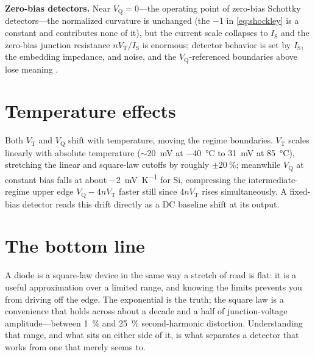 \documentclass[12pt]{article}
\newcommand{\IS}{I_{\mathrm{S}}}
\newcommand{\VT}{V_{\mathrm{T}}}
\newcommand{\VQ}{V_{\mathrm{Q}}}
\begin{document}
\textbf{Zero-bias detectors.}
Near $\VQ = 0$---the operating point of zero-bias Schottky detectors---the normalized curvature is unchanged (the $-1$ in \eqref{eq:shockley} is a constant and contributes none of it), but the current scale collapses to $\IS$ and the zero-bias junction resistance $n\VT/\IS$ is enormous; detector behavior is set by $\IS$, the embedding impedance, and noise, and the $\VQ$-referenced boundaries above lose meaning \cite{maas}.

\section*{Temperature effects}

Both $\VT$ and $\VQ$ shift with temperature, moving the regime boundaries.
$\VT$ scales linearly with absolute temperature ($\sim$\SI{20}{\milli\volt} at \SI{-40}{\degreeCelsius} to \SI{31}{\milli\volt} at \SI{85}{\degreeCelsius}), stretching the linear and square-law cutoffs by roughly $\pm\SI{20}{\percent}$; meanwhile $\VQ$ at constant bias falls at about \SI{-2}{\milli\volt\per\kelvin} for Si, compressing the intermediate-regime upper edge $\VQ - 4n\VT$ faster still since $4n\VT$ rises simultaneously.
A fixed-bias detector reads this drift directly as a DC baseline shift at its output.

\section*{The bottom line}

A diode is a square-law device in the same way a stretch of road is flat: it is a useful approximation over a limited range, and knowing the limits prevents you from driving off the edge.
The exponential is the truth; the square law is a convenience that holds across about a decade and a half of junction-voltage amplitude---between \SI{1}{\percent} and \SI{25}{\percent} second-harmonic distortion.
Understanding that range, and what sits on either side of it, is what separates a detector that works from one that merely seems to.
\end{document}

